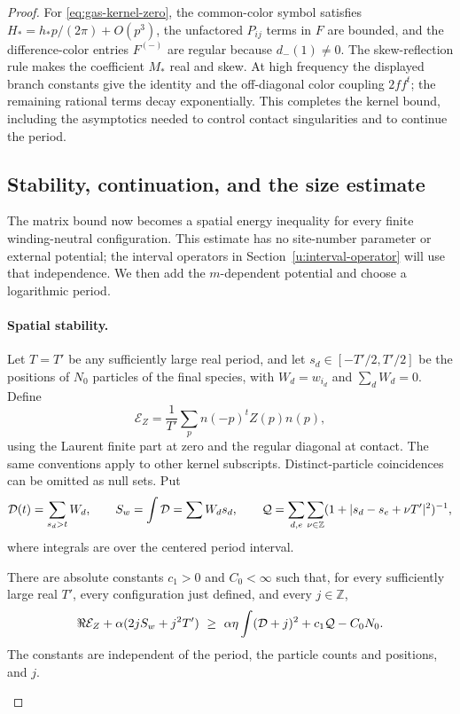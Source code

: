 \begin{proof}
For \eqref{eq:gas-kernel-zero}, the common-color symbol satisfies
\(H_*=h_*p/(2\pi)+O(p^3)\), the unfactored \(P_{ij}\) terms in
\(F\) are bounded, and the difference-color entries \(F^{(-)}\) are
regular because \(d_-(1)\ne0\). The skew-reflection rule makes the
coefficient \(M_*\) real and skew. At high frequency the displayed
branch constants give the identity and the off-diagonal color coupling
\(2ff^t\); the remaining rational terms decay exponentially. This
completes the kernel bound, including the asymptotics needed to control
contact singularities and to continue the period.

\subsection{Stability, continuation, and the size estimate}
The matrix bound now becomes a spatial energy inequality for every
finite winding-neutral configuration. This estimate has no site-number
parameter or external potential; the interval operators in
Section~\ref{u:interval-operator} will use that independence. We then
add the \(m\)-dependent potential and choose a logarithmic period.

\paragraph{Spatial stability.}
Let \(T=T'\) be any sufficiently large real period, and let
\(s_d\in[-T'/2,T'/2]\) be the positions of \(N_0\) particles of the
final species, with \(W_d=w_{i_d}\) and \(\sum_dW_d=0\).
Define
\[
 \mathcal E_Z=\frac1{T'}\sum_p n(-p)^tZ(p)n(p),
\]
using the Laurent finite part at zero and the regular diagonal at
contact. The same conventions apply to other kernel subscripts.
Distinct-particle coincidences can be omitted as null sets. Put
\[
 {\cal D}(t)=\sum_{s_d>t} W_d,\qquad S_w=\int{\cal D}=\sum W_d s_d,\qquad
 {\cal Q}=\sum_{d,e}\sum_{\nu\in\mathbb Z}(1+|s_d-s_e+\nu T'|^2)^{-1},
\]
where integrals are over the centered period interval.

\begin{auxlemma}
There are absolute constants \(c_1>0\) and \(C_0<\infty\) such that,
for every sufficiently large real \(T'\), every configuration just
defined, and every \(j\in\mathbb Z\),
\begin{equation}
 \Re{\cal E}_Z+\alpha(2jS_w+j^2T')\ \ge\
 \alpha\eta\int({\cal D}+j)^2+c_1{\cal Q}-C_0N_0.
 \label{eq:legacy-P-P3}
\end{equation}
The constants are independent of the period, the particle counts and
positions, and \(j\).
\end{auxlemma}


\end{proof}
